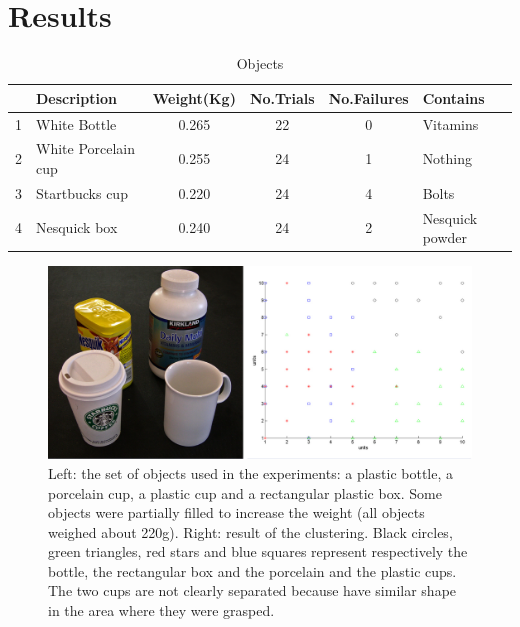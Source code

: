\section{Results}
\label{sec-results}

\begin{table}[tb]
  \caption{Objects} \label{tab:objects} \centering
  \begin{tabular}{|c|l|c|c|c|l|}
    \hline
    &Description& Weight(Kg)&No.Trials&No.Failures&Contains \\
    \hline
    1&White Bottle        & 0.265 & 22& 0 & Vitamins\\
    2&White Porcelain cup & 0.255 & 24& 1 & Nothing\\
    3&Startbucks cup      & 0.220 & 24& 4 & Bolts \\
    4&Nesquick box        & 0.240 & 24& 2 & Nesquick powder\\

    \hline
  \end{tabular}
\end{table}

\begin{figure}[tbp]
\centerline{
\includegraphics[width=6.0in]{./figures/objects-clusters.eps}
}\caption{Left: the set of objects used in the experiments: a plastic bottle,
a porcelain cup, a plastic cup and a rectangular plastic box. Some objects were
partially filled to increase the weight (all objects weighed about 220g).
Right: result of the clustering. Black circles, green
triangles, red stars and blue squares represent respectively the bottle,
the rectangular box and the porcelain and the plastic cups. The two cups are not
clearly separated because have similar shape in the area where they were grasped.}
\label{fig:Objects}
\end{figure}


